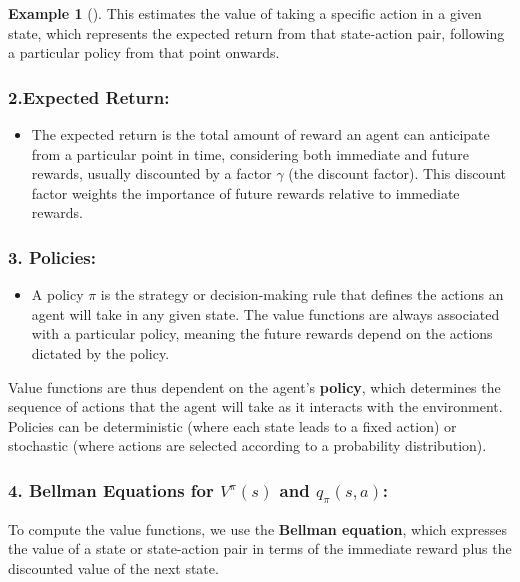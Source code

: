 \documentclass[
  letterpaper,
]{krantz}
\providecommand{\tightlist}{%
  \setlength{\itemsep}{0pt}\setlength{\parskip}{0pt}}\usepackage{longtable,booktabs,array}
\theoremstyle{plain}
\theoremstyle{definition}
\newtheorem{example}{Example}[chapter]
\theoremstyle{definition}
\theoremstyle{remark}
\begin{document}
\begin{example}[]
This estimates the value of taking a specific action in a given state,
which represents the expected return from that state-action pair,
following a particular policy from that point onwards.

\subsubsection{2.Expected Return:}\label{expected-return}

\begin{itemize}
\tightlist
\item
  The expected return is the total amount of reward an agent can
  anticipate from a particular point in time, considering both immediate
  and future rewards, usually discounted by a factor \(\gamma\) (the
  discount factor). This discount factor weights the importance of
  future rewards relative to immediate rewards.
\end{itemize}

\subsubsection{\texorpdfstring{3.
\textbf{Policies}:}{3. Policies:}}\label{policies}

\begin{itemize}
\tightlist
\item
  A policy \(\pi\) is the strategy or decision-making rule that defines
  the actions an agent will take in any given state. The value functions
  are always associated with a particular policy, meaning the future
  rewards depend on the actions dictated by the policy.
\end{itemize}

Value functions are thus dependent on the agent's \textbf{policy}, which
determines the sequence of actions that the agent will take as it
interacts with the environment. Policies can be deterministic (where
each state leads to a fixed action) or stochastic (where actions are
selected according to a probability distribution).

\subsubsection{\texorpdfstring{4. \textbf{Bellman Equations for
\(V^\pi(s)\) and
\(q_{\pi}(s, a)\)}:}{4. Bellman Equations for V\^{}\textbackslash pi(s) and q\_\{\textbackslash pi\}(s, a):}}\label{bellman-equations-for-vpis-and-q_pis-a}

To compute the value functions, we use the \textbf{Bellman equation},
which expresses the value of a state or state-action pair in terms of
the immediate reward plus the discounted value of the next state.


\end{example}
\end{document}
